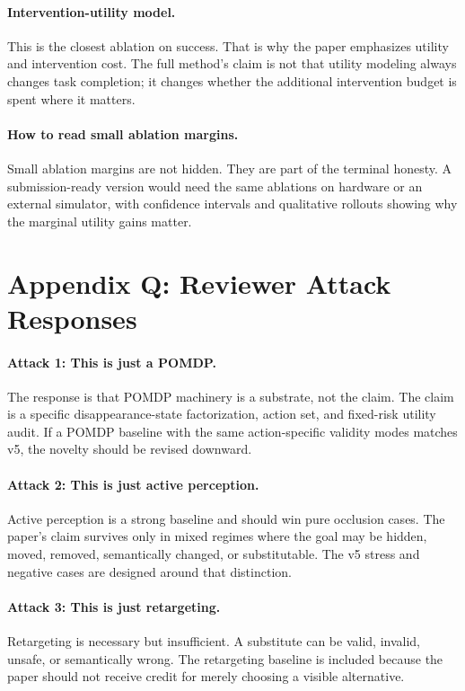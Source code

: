 \documentclass{article}
\begin{document}
\paragraph{Intervention-utility model.}
This is the closest ablation on success. That is why the paper emphasizes utility and intervention cost. The full method's claim is not that utility modeling always changes task completion; it changes whether the additional intervention budget is spent where it matters.

\paragraph{How to read small ablation margins.}
Small ablation margins are not hidden. They are part of the terminal honesty. A submission-ready version would need the same ablations on hardware or an external simulator, with confidence intervals and qualitative rollouts showing why the marginal utility gains matter.

\section{Appendix Q: Reviewer Attack Responses}
\paragraph{Attack 1: This is just a POMDP.}
The response is that POMDP machinery is a substrate, not the claim. The claim is a specific disappearance-state factorization, action set, and fixed-risk utility audit. If a POMDP baseline with the same action-specific validity modes matches v5, the novelty should be revised downward.

\paragraph{Attack 2: This is just active perception.}
Active perception is a strong baseline and should win pure occlusion cases. The paper's claim survives only in mixed regimes where the goal may be hidden, moved, removed, semantically changed, or substitutable. The v5 stress and negative cases are designed around that distinction.

\paragraph{Attack 3: This is just retargeting.}
Retargeting is necessary but insufficient. A substitute can be valid, invalid, unsafe, or semantically wrong. The retargeting baseline is included because the paper should not receive credit for merely choosing a visible alternative.
\end{document}
